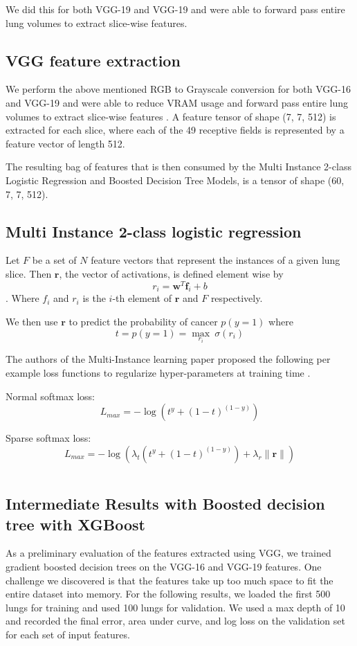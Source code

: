 \documentclass[twocolumn,10pt]{article}
\renewcommand{\b}{\boldsymbol}
\begin{document}
 We did this for both VGG-19 and VGG-19 and were able to forward pass entire
 lung volumes to extract slice-wise features.

\subsection{VGG feature extraction}

We perform the above mentioned RGB to Grayscale conversion for both VGG-16 and VGG-19 
and were able to reduce VRAM usage and forward pass entire lung volumes to 
extract slice-wise features \cite{simonyan2014vgg}. A feature tensor of shape (7, 7, 512) is extracted
for each slice, where each of the 49 receptive fields is represented by a feature
vector of length 512.

The resulting bag of features that is then consumed by the
Multi Instance 2-class Logistic Regression and Boosted Decision Tree Models,
is a tensor of shape (60, 7, 7, 512).

\subsection{Multi Instance 2-class logistic regression}
Let $F$ be a set of $N$ feature vectors that represent the instances of a given
lung slice. 
Then $\b r$, the vector of activations, is defined element wise by
$$r_i = \b w^T \b f_i + b$$.
Where $f_i$ and $r_i$ is the $i$-th element of $\b r$ and $F$ respectively.

We then use $\b r $ to predict the probability of cancer $p(y = 1)$ where
$$t = p(y = 1) = \max_{r_i} \ \sigma(r_i)$$

The authors of the Multi-Instance learning paper proposed the following per example loss functions
to regularize hyper-parameters at training time \cite{mil_mammogram}.

Normal softmax loss:
$$L_{max} = -\log(t^y + (1-t) ^{(1-y)})$$

Sparse softmax loss:
$$L_{max} = -\log(\lambda_t(t^y + (1-t) ^{(1-y)}) + \lambda_r\|\b r\|)$$

$$$$
\subsection {Intermediate Results with Boosted decision tree with XGBoost}
As a preliminary evaluation of the features extracted using VGG, we trained gradient boosted decision trees on the VGG-16 and VGG-19 features. One challenge we discovered is that the features take up too much space to fit the entire dataset into memory. For the following results, we loaded the first 500 lungs for training and used 100 lungs for validation. We used a max depth of 10 and recorded the final error, area under curve, and log loss on the validation set for each set of input features.
\end{document}
